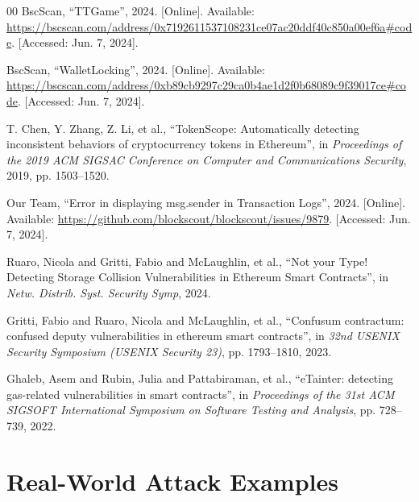 \begin{thebibliography}{00}
 BscScan, ``TTGame'', 2024. [Online]. Available: \url{https://bscscan.com/address/0x7192611537108231ce07ac20ddf40c850a00ef6a#code}. [Accessed: Jun. 7, 2024].

 BscScan, ``WalletLocking'', 2024. [Online]. Available: \url{https://bscscan.com/address/0xb89cb9297c29ca0b4ae1d2f0b68089c9f39017ce#code}. [Accessed: Jun. 7, 2024].

 T. Chen, Y. Zhang, Z. Li, et al., ``TokenScope: Automatically detecting inconsistent behaviors of cryptocurrency tokens in Ethereum'', in \textit{Proceedings of the 2019 ACM SIGSAC Conference on Computer and Communications Security}, 2019, pp. 1503--1520.

 Our Team, ``Error in displaying msg.sender in Transaction Logs'', 2024. [Online]. Available: \url{https://github.com/blockscout/blockscout/issues/9879}. [Accessed: Jun. 7, 2024].

 Ruaro, Nicola and Gritti, Fabio and McLaughlin, et al., ``Not your Type! Detecting Storage Collision Vulnerabilities in Ethereum Smart Contracts'', in \textit{Netw. Distrib. Syst. Security Symp}, 2024.

 Gritti, Fabio and Ruaro, Nicola and McLaughlin, et al., ``Confusum contractum: confused deputy vulnerabilities in ethereum smart contracts'', in \textit{32nd USENIX Security Symposium (USENIX Security 23)}, pp. 1793--1810, 2023.

 Ghaleb, Asem and Rubin, Julia and Pattabiraman, et al., ``eTainter: detecting gas-related vulnerabilities in smart contracts'', in \textit{Proceedings of the 31st ACM SIGSOFT International Symposium on Software Testing and Analysis}, pp. 728--739, 2022.

\end{thebibliography}



\appendices


\section{Real-World Attack Examples}

